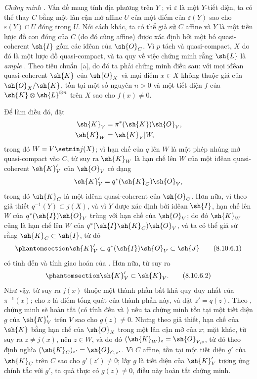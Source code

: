 \documentclass[oneside,10pt]{amsart}
\newcommand{\oldpage}[2][]{\marginnote{\normalfont\footnotesize\textbf{#1}~|~#2}\ignorespaces}
\let\EGAOriginalLabel\label
\renewcommand{\label}[1]{\phantomsection\EGAOriginalLabel{#1}}
\begin{document}
\begin{env}[8.10.6]
\label{II.8.10.6}
\emph{Chứng minh .}
Vấn đề mang tính địa phương trên $Y$ ;
vì $\varepsilon$ là một $Y$-tiết diện, ta có thể thay $C$ bằng một lân cận mở affine $U$ của một điểm của $\varepsilon(Y)$ sao cho $\varepsilon(Y)\cap U$ đóng trong $U$.
Nói cách khác, ta có thể giả sử $C$ affine và $Y$ là một tiền lược đồ con đóng của $C$ (do đó cũng affine) được xác định bởi một bó quasi-coherent
\oldpage[II]{188}
$\sh{I}$ gồm các iđêan của $\sh{O}_C$.
Vì $p$ tách và quasi-compact, $X$ do đó là một lược đồ quasi-compact, và ta quy về việc chứng minh rằng $\sh{L}$ là \emph{ample} .
Theo tiêu chuẩn~[a], do đó ta phải chứng minh điều sau:
với mọi iđêan quasi-coherent $\sh{K}$ của $\sh{O}_X$ và mọi điểm $x\in X$ không thuộc giá của $\sh{O}_X/\sh{K}$, tồn tại một số nguyên $n>0$ và một tiết diện $f$ của $\sh{K}\otimes\sh{L}^{\otimes n}$ trên $X$ sao cho $f(x)\neq0$.

Để làm điều đó, đặt
\begin{align*}
  \sh{K}_V &= \pi^*(\sh{K})\sh{O}_V,\\
  \sh{K}_W &= \sh{K}_V|W,
\end{align*}
trong đó $W=V\setmin j(X)$;
vì hạn chế của $q$ lên $W$ là một phép nhúng mở quasi-compact vào $C$, từ  suy ra $\sh{K}_W$ là hạn chế lên $W$ của một iđêan quasi-coherent $\sh{K}'_V$ của $\sh{O}_V$ có dạng
\[
    \sh{K}'_V = q^*(\sh{K}_C)\sh{O}_V,
\]
trong đó $\sh{K}_C$ là một iđêan quasi-coherent của $\sh{O}_C$.
Hơn nữa, vì theo giả thiết $q^{-1}(Y)\subset j(X)$, và vì $Y$ được xác định bởi iđêan $\sh{I}$, hạn chế lên $W$ của $q^*(\sh{I})\sh{O}_V$ trùng với hạn chế của $\sh{O}_V$; do đó $\sh{K}_W$ cũng là hạn chế lên $W$ của $q^*(\sh{I}\sh{K}_C)\sh{O}_V$, và ta có thể giả sử rằng $\sh{K}_C\subset\sh{I}$, từ đó
\[
\label{II.8.10.6.1}
    \sh{K}'_V \subset q^*(\sh{I})\sh{O}_V \subset \sh{J}
\tag{8.10.6.1}
\]
có tính đến  và tính giao hoán của .
Hơn nữa, từ  suy ra
\[
\label{II.8.10.6.2}
    \sh{K}'_V \subset \sh{K}_V.
\tag{8.10.6.2}
\]
Như vậy, từ  suy ra $j(x)$ thuộc một thành phần bất khả quy duy nhất của $\pi^{-1}(x)$;
cho $z$ là điểm tổng quát của thành phần này, và đặt $z'=q(z)$.
Theo , chứng minh sẽ hoàn tất (có tính đến  và ) nếu ta chứng minh tồn tại một tiết diện $g$ của $\sh{K}'_V$ trên $V$ sao cho $g(z)\neq0$.
Nhưng theo giả thiết, hạn chế của $\sh{K}$ bằng hạn chế của $\sh{O}_X$ trong một lân cận mở của $x$;
mặt khác, từ  suy ra $z\neq j(x)$, nên $z\in W$, và do đó $(\sh{K}_W)_z=\sh{O}_{V,z}$, từ đó theo định nghĩa $(\sh{K}_C)_{z'}=\sh{O}_{C,z'}$.
Vì $C$ affine, tồn tại một tiết diện $g'$ của $\sh{K}_C$ trên $C$ sao cho $g'(z')\neq0$; lấy $g$ là tiết diện của $\sh{K}'_V$ tương ứng chính tắc với $g'$, ta quả thực có $g(z)\neq0$, điều này hoàn tất chứng minh.
\end{env}
\end{document}
